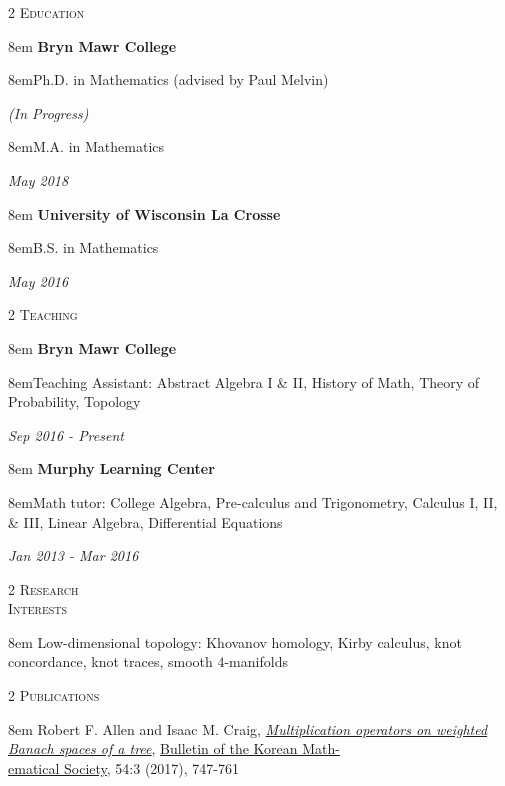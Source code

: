 \documentclass[11pt]{article}
\newcommand{\itemreg}[1]{\begin{addmargin}[0em]{8em} #1 \end{addmargin}}
\newcommand{\iteminddate}[2]{\begin{addmargin}[1.75em]{8em}#1\end{addmargin}\vspace{-1.15em}\hfill\textit{#2}\\}
\newcommand{\iteminddateext}[2]{\begin{addmargin}[1.75em]{8em}#1\end{addmargin}\vspace{-2.6em}\hfill\textit{#2}\\ \vspace{1.5em}}
\begin{document}
\null
\vskip20pt



\begin{multicols}{2}
	\textsc{Education} 
	
	\columnbreak
	
	\itemreg{\textbf{Bryn Mawr College}}
		\iteminddate{Ph.D. in Mathematics (advised by Paul Melvin)}{(In Progress)}
		\iteminddate{M.A. in Mathematics}{May 2018}
	\vspace{.35em}
	\itemreg{\textbf{University of Wisconsin La Crosse}}
		\iteminddate{B.S. in Mathematics}{May 2016}
\end{multicols}
\vspace{-.5em}



\begin{multicols}{2}
	\textsc{Teaching} 
	
	\columnbreak
	
	\itemreg{\textbf{Bryn Mawr College}}
		\iteminddateext{Teaching Assistant: Abstract Algebra I \& II, History of Math, Theory of Probability, Topology}{Sep 2016 - Present}
		\vspace{.35em}
	\itemreg{\textbf{Murphy Learning Center}}
		\iteminddateext{Math tutor: College Algebra, Pre-calculus and Trigonometry, Calculus I, II, \& III, Linear Algebra, Differential Equations}{Jan 2013 - Mar 2016}
\end{multicols}
\vspace{.5em}



\begin{multicols}{2}
	\textsc{Research \\ Interests}
	
	\columnbreak
	
	\itemreg{Low-dimensional topology: Khovanov homology, Kirby calculus, knot concordance, knot traces, smooth $4$-manifolds}
\end{multicols}
\vspace{-.5em}



\begin{multicols}{2}
	\textsc{Publications}
	
	\columnbreak
	
	\itemreg{Robert F. Allen and Isaac M. Craig, \textit{\href{https://imsundberg.github.io/files/mult_op.pdf}{Multiplication operators on weighted Banach spaces of a tree}}, \href{http://bkms.kms.or.kr/}{Bulletin of the Korean Math-\\ematical Society}, 54:3 (2017), 747-761}
\end{multicols}
\vspace{-.5em}
\end{document}
